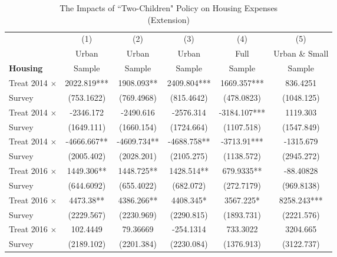 \documentclass[12pt]{extarticle}
\begin{document}
\begin{table}
\centering
\caption{The Impacts of ``Two-Children" Policy on Housing Expenses \\ (Extension)} \label{app:housing_extend}
\begin{threeparttable}
\def\sym#1{\ifmmode^{#1}\else\(^{#1}\)\fi}
\begin{tabular}{l*{5}{c}}
\hline\hline
		&\multicolumn{1}{c}{(1)}&\multicolumn{1}{c}{(2)}&\multicolumn{1}{c}{(3)}&\multicolumn{1}{c}{(4)}&\multicolumn{1}{c}{(5)}\\
		&\multicolumn{1}{c}{Urban}&\multicolumn{1}{c}{Urban}&\multicolumn{1}{c}{Urban}&\multicolumn{1}{c}{Full}&\multicolumn{1}{c}{Urban \& Small}\\
\textbf{Housing}		&\multicolumn{1}{c}{Sample}&\multicolumn{1}{c}{Sample}&\multicolumn{1}{c}{Sample}&\multicolumn{1}{c}{Sample}&\multicolumn{1}{c}{Sample}\\
\hline
Treat 2014 $\times$ &    2022.819***&    1908.093** &    2409.804***&    1669.357***&    836.4251   \\
\quad 2012 Survey         &  (753.1622)   &  (769.4968)   &  (815.4642)   &  (478.0823)   &  (1048.125)   \\
Treat 2014 $\times$ &   -2346.172   &   -2490.616   &   -2576.314   &   -3184.107***&    1119.303   \\
\quad 2014 Survey         &  (1649.111)   &  (1660.154)   &  (1724.664)   &  (1107.518)   &  (1547.849)   \\
Treat 2014 $\times$ &   -4666.667** &   -4609.734** &   -4688.758** &    -3713.91***&   -1315.679   \\
\quad 2016 Survey         &  (2005.402)   &  (2028.201)   &  (2105.275)   &  (1138.572)   &  (2945.272)   \\
Treat 2016 $\times$ &    1449.306** &    1448.725** &    1428.514** &    679.9335** &   -88.40828   \\
\quad 2012 Survey         &  (644.6092)   &  (655.4022)   &   (682.072)   &  (272.7179)   &  (969.8138)   \\
Treat 2016 $\times$ &     4473.38** &    4386.266** &    4408.345*  &    3567.225*  &    8258.243***\\
\quad 2014 Survey         &  (2229.567)   &  (2230.969)   &  (2290.815)   &  (1893.731)   &  (2221.576)   \\
Treat 2016 $\times$ &    102.4449   &    79.36669   &   -254.1314   &    733.3022   &    3204.665   \\
\quad 2016 Survey         &  (2189.102)   &  (2201.384)   &  (2230.084)   &  (1376.913)   &  (3122.737)   \\

\end{tabular}
\end{threeparttable}
\end{table}
\end{document}
